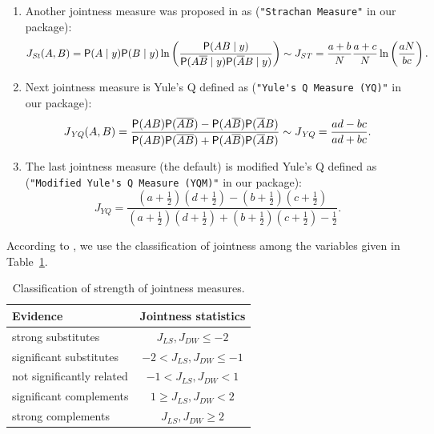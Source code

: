 \begin{enumerate}
	\item Another jointness measure was proposed in
		\cite{Strachan-JAE-2009} as
		(\lstinline!"Strachan Measure"! in our package):
		\begin{equation}
			J_{\mathit{St}}(A,B) = \mathsf{P}(A\mid y)\mathsf{P}(B\mid y)\ln\left(
			\frac{\mathsf{P}(AB\mid y)}{\mathsf{P}(A\overline{B}\mid y)\mathsf{P}(\overline{A}B\mid y)}\right)
			\sim J_{\mathit{ST}} = \frac{a+b}{N}\frac{a+c}{N}\ln\left(\frac{aN}{bc}\right).
			\label{St_jointness}
		\end{equation}
	\item Next jointness measure is Yule's Q defined as
		(\lstinline!"Yule's Q Measure (YQ)"! in our package):
		\begin{equation}
			J_{\mathit{YQ}}(A,B) = 
			\frac{\mathsf{P}(AB)\mathsf{P}(\overline{AB})-\mathsf{P}(A\overline{B})\mathsf{P}(\overline{A}B)}
			{\mathsf{P}(AB)\mathsf{P}(\overline{AB})+\mathsf{P}(A\overline{B})\mathsf{P}(\overline{A}B)}
			\sim J_{\mathit{YQ}} = \frac{ad - bc}{ad + bc}.
			\label{Yq_jointness}
		\end{equation}
		\item The last jointness measure (the default) is
			modified Yule's Q defined as
			(\lstinline!"Modified Yule's Q Measure (YQM)"! in our package):
	\begin{equation}		
		J_{\mathit{YQ}} = \frac
		{\left(a+\frac{1}{2}\right)\left(d+\frac{1}{2}\right) -
		\left(b+\frac{1}{2}\right)\left(c+\frac{1}{2}\right)} 
		{\left(a+\frac{1}{2}\right)\left(d+\frac{1}{2}\right) +
			\left(b+\frac{1}{2}\right)\left(c+\frac{1}{2}\right) - \frac{1}{2}}.
		\label{YqM_jointness}
	\end{equation}
\end{enumerate}

According to \cite{DoppelhoferWeeks2009}, we use the classification
of jointness among the variables given in Table~\ref{tab1}.

\begin{table}[hbt!]
	\centering
	\caption{Classification of strength of jointness measures.}\label{tab1}	
	\begin{tabular}{lc}\hline
		Evidence & Jointness statistics \\ \hline
		strong substitutes & $J_{\mathit{LS}}, J_{\mathit{DW}} \le -2 $ \\
		significant substitutes & $-2 <J_{\mathit{LS}}, J_{\mathit{DW}} \le-1 $ \\
		not significantly related & $-1< J_{\mathit{LS}}, J_{\mathit{DW}} <1 $ \\
		significant complements & $ 1\ge J_{\mathit{LS}}, J_{\mathit{DW}} <2 $ \\
		strong complements & $ J_{\mathit{LS}}, J_{\mathit{DW}} \ge 2 $ \\ \hline
	\end{tabular}	
\end{table} 
